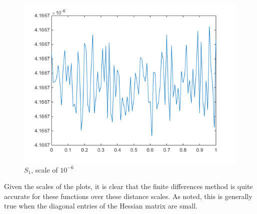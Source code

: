 \documentclass[11pt,letterpaper]{article}
\begin{document}
\begin{figure}[!htb]
  \includegraphics[width=\linewidth]{figures/gradDifS.png}
  \caption{$S_1$, scale of $10^{-6}$}\label{fig:gradDifS}
\endminipage
\end{figure}

Given the scales of the plots, it is clear that the finite differences method is quite accurate for these functions over these distance scales. As noted, this is generally true when the diagonal entries of the Hessian matrix are small.
\end{document}
